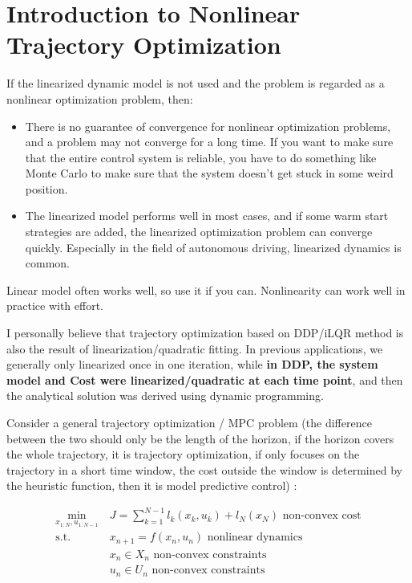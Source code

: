 \section{Introduction to Nonlinear Trajectory Optimization}
If the linearized dynamic model is not used and the problem is regarded as a nonlinear optimization problem, then:
\begin{itemize}
    \item There is no guarantee of convergence for nonlinear optimization problems, and a problem may not converge for a long time. If you want to make sure that the entire control system is reliable, you have to do something like Monte Carlo to make sure that the system doesn't get stuck in some weird position.
    \item The linearized model performs well in most cases, and if some warm start strategies are added, the linearized optimization problem can converge quickly. Especially in the field of autonomous driving, linearized dynamics is common.
\end{itemize}
Linear model often works well, so use it if you can. Nonlinearity can work well in practice with effort.

I personally believe that trajectory optimization based on DDP/iLQR method is also the result of linearization/quadratic fitting. In previous applications, we generally only linearized once in one iteration, while \textbf{in DDP, the system model and Cost were linearized/quadratic at each time point}, and then the analytical solution was derived using dynamic programming.

Consider a general trajectory optimization / MPC problem (the difference between the two should only be the length of the horizon, if the horizon covers the whole trajectory, it is trajectory optimization, if only focuses on the trajectory in a short time window, the cost outside the window is determined by the heuristic function, then it is model predictive control) :

\begin{equation}
    \begin{aligned}
        \min_{x_{1:N}, u_{1:N-1}} \  & J = \sum_{k=1}^{N-1} l_k(x_k, u_k) + l_N(x_N) \text{ non-convex cost} \\
        \text{s.t.}\qquad \          & x_{n+1} = f(x_n,u_n) \text{ nonlinear dynamics}                       \\
                                     & x_n \in X_n \text{ non-convex constraints}                            \\
                                     & u_n \in U_n \text{ non-convex constraints}
    \end{aligned}
    \label{equ:nonlinear_problem}
\end{equation}


